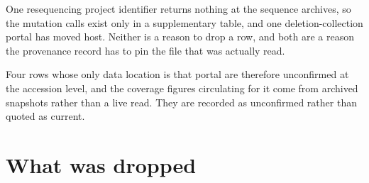  One resequencing project identifier
returns nothing at the sequence archives, so the mutation calls exist only in a
supplementary table, and one deletion-collection portal has moved host. Neither is a
reason to drop a row, and both are a reason the provenance record has to pin the file that
was actually read.

 Four
rows whose only data location is that portal are therefore unconfirmed at the accession
level, and the coverage figures circulating for it come from archived snapshots rather than
a live read. They are recorded as unconfirmed rather than quoted as current.

\section{What was dropped}\label{sec:excluded}



